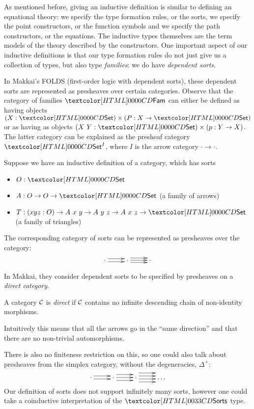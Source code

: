 As mentioned before, giving an inductive definition is similar to
defining an equational theory: we specify the type formation rules, or
the sorts, we specify the point constructors, or the function symbols
and we specify the path constructors, or the equations. The inductive
types themselves are the term models of the theory described by the
constructors. One important aspect of our inductive definitions is
that our type formation rules do not just give us a collection of
types, but also type \emph{families}: we do have \emph{dependent
  sorts}.

In Makkai's FOLDS (first-order logic with dependent sorts), these
dependent sorts are represented as presheaves over certain
categories. Observe that the category of families $\Fam$ can either be
defined as having objects $(X : \Set) \times (P : X \to \Set)$ or as
having as objects $(X\ Y : \Set) \times (p : Y \to X)$. The latter
category can be explained as the presheaf category $\Set^I$, where $I$
is the arrow category $\cdot \to \cdot$.

\begin{example}
  Suppose we have an inductive definition of a category, which has
  sorts
%
  \begin{itemize}
  \item $O : \Set$
  \item $A : O \to O \to \Set$ (a family of arrows)
  \item $T : (x y z : O) \to A\ x\ y \to A\ y\ z \to A\ x\ z \to \Set$
    (a family of triangles)
  \end{itemize}
%
  The corresponding category of sorts can be represented as presheaves
  over the category:
$$
\xymatrix{ \cdot \ar@<-.5ex>[r] \ar@<.5ex>[r] &\cdot \ar@<-.75ex>[r]
  \ar@<.0ex>[r] \ar@<.75ex>[r] &\cdot }
$$
\end{example}

In Makkai, they consider dependent sorts to be specified by presheaves
on a \emph{direct category}.
\begin{definition}
  A category $\mathcal{C}$ is \emph{direct} if $\mathcal{C}$ contains no infinite
  descending chain of non-identity morphisms.
\end{definition}
Intuitively this means that all the arrows go in the ``same
direction'' and that there are no non-trivial automorphisms.

There is also no finiteness restriction on this, so one could also
talk about presheaves from the simplex category, without the
degeneracies, $\Delta^+$:
$$
\xymatrix{
\cdot     
\ar@<-.5ex>[r]
\ar@<.5ex>[r]
&\cdot
\ar@<-1ex>[r]
\ar@<0ex>[r]
\ar@<1ex>[r]
&\cdot
\ar@<-1.5ex>[r]
\ar@<-.5ex>[r]
\ar@<.5ex>[r]
\ar@<1.5ex>[r]
&\hdots
}
$$
Our definition of sorts does not support infinitely many sorts,
however one could take a coinductive interpretation of the $\sortsty$
type.

